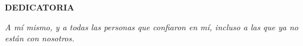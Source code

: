 \vspace*{3cm}
\begin{center}
{\fontsize{14}{16}\selectfont\bfseries DEDICATORIA}
\end{center}

\vspace{1cm}
\begin{flushright}
\begin{minipage}{0.6\textwidth}
\raggedleft\itshape
A mí mismo, y a todas las personas que confiaron en mí, incluso a las que ya no están con nosotros.
\end{minipage}
\end{flushright}

\vspace{4cm}
